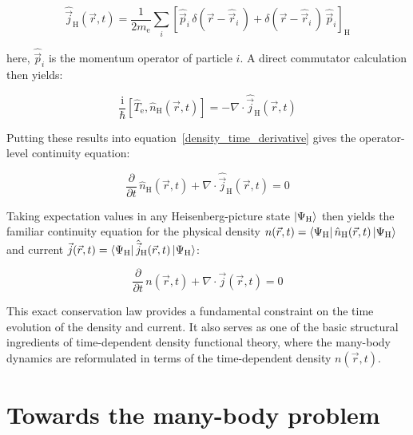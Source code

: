 \begin{equation}
    \hat{\vec{j}}_\mathrm{H}(\vec{r},t)
    = \frac{1}{2m_\mathrm{e}}\sum_i\left[\hat{\vec{p}}_i\,\delta(\vec{r}-\hat{\vec{r}}_i\,)+\delta(\vec{r}-\hat{\vec{r}}_i\,)\,\hat{\vec{p}}_i\right]_\mathrm{H}
\label{heisenberg-picture_current_operator}
\end{equation}

here, $\hat{\vec{p}}_i$ is the momentum operator of particle $i$. A direct commutator calculation then yields:

\begin{equation}
    \frac{\mathrm{i}}{\hbar}\left[\hat{T}_\mathrm{e},\hat n_\mathrm{H}(\vec{r},t)\right]
    = -\nabla\cdot\hat{\vec{j}}_\mathrm{H}(\vec{r},t)
\label{direct_commutator}
\end{equation}

Putting these results into equation~\eqref{density_time_derivative} gives the operator-level continuity equation:

\begin{equation}
\frac{\partial}{\partial t}\,\hat{n}_\mathrm{H}(\vec{r},t)+\nabla\cdot\hat{\vec j}_\mathrm{H}(\vec{r},t)=0
\label{continuity_operator}
\end{equation}

Taking expectation values in any Heisenberg-picture state $\ket{\Psi_\mathrm{H}}$ then yields the familiar continuity equation for the physical density $n(\vec{r},t)=\bra{\Psi_\mathrm{H}}\hat{n}_\mathrm{H}(\vec{r},t)\ket{\Psi_\mathrm{H}}$
and current $\vec{j}(\vec{r},t)=\bra{\Psi_\mathrm{H}}\hat{\vec{j}}_\mathrm{H}(\vec{r},t)\ket{\Psi_\mathrm{H}}$:

\begin{equation}
    \frac{\partial}{\partial t}\,n(\vec{r},t)+\nabla\cdot\vec{j}(\vec{r},t)=0
\label{continuity_expectation}
\end{equation}

This exact conservation law provides a fundamental constraint on the time evolution of the density and current. It also serves as one of the basic structural ingredients of time-dependent density functional theory, where the many-body dynamics are reformulated in terms of the time-dependent density $n(\vec{r},t)$.

\newpage
\section{Towards the many-body problem}
\label{sec:toward_many_body_problem}

